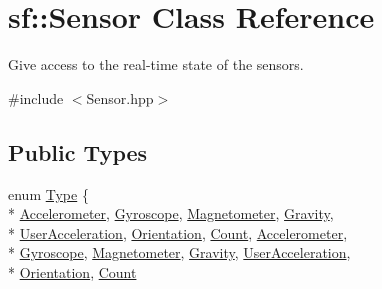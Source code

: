 \hypertarget{classsf_1_1_sensor}{\section{sf\-:\-:Sensor Class Reference}
\label{classsf_1_1_sensor}
}


Give access to the real-\/time state of the sensors.  




{\ttfamily \#include $<$Sensor.\-hpp$>$}

\subsection*{Public Types}
\begin{DoxyCompactItemize}
\item 
enum \hyperlink{classsf_1_1_sensor_a687375af3ab77b818fca73735bcaea84}{Type} \{ \\*
\hyperlink{classsf_1_1_sensor_a687375af3ab77b818fca73735bcaea84a0f0a57d34c0d6a932c3088e7d6a16fde}{Accelerometer}, 
\hyperlink{classsf_1_1_sensor_a687375af3ab77b818fca73735bcaea84a8a6a136ed089dd78dde8e9f7f3a86265}{Gyroscope}, 
\hyperlink{classsf_1_1_sensor_a687375af3ab77b818fca73735bcaea84ae4386b358031ebd214c33475d55f93ab}{Magnetometer}, 
\hyperlink{classsf_1_1_sensor_a687375af3ab77b818fca73735bcaea84a88fc8025c897135e18ea02cfe26c7361}{Gravity}, 
\\*
\hyperlink{classsf_1_1_sensor_a687375af3ab77b818fca73735bcaea84a34768d68b445e72ff6a43fde92a7b921}{User\-Acceleration}, 
\hyperlink{classsf_1_1_sensor_a687375af3ab77b818fca73735bcaea84a9fca0168d56fad3e328d59d09f3d4fb3}{Orientation}, 
\hyperlink{classsf_1_1_sensor_a687375af3ab77b818fca73735bcaea84ade647efb34c9d194e432fa0397d3f656}{Count}, 
\hyperlink{classsf_1_1_sensor_a687375af3ab77b818fca73735bcaea84a0f0a57d34c0d6a932c3088e7d6a16fde}{Accelerometer}, 
\\*
\hyperlink{classsf_1_1_sensor_a687375af3ab77b818fca73735bcaea84a8a6a136ed089dd78dde8e9f7f3a86265}{Gyroscope}, 
\hyperlink{classsf_1_1_sensor_a687375af3ab77b818fca73735bcaea84ae4386b358031ebd214c33475d55f93ab}{Magnetometer}, 
\hyperlink{classsf_1_1_sensor_a687375af3ab77b818fca73735bcaea84a88fc8025c897135e18ea02cfe26c7361}{Gravity}, 
\hyperlink{classsf_1_1_sensor_a687375af3ab77b818fca73735bcaea84a34768d68b445e72ff6a43fde92a7b921}{User\-Acceleration}, 
\\*
\hyperlink{classsf_1_1_sensor_a687375af3ab77b818fca73735bcaea84a9fca0168d56fad3e328d59d09f3d4fb3}{Orientation}, 
\hyperlink{classsf_1_1_sensor_a687375af3ab77b818fca73735bcaea84ade647efb34c9d194e432fa0397d3f656}{Count}

\end{DoxyCompactItemize}
